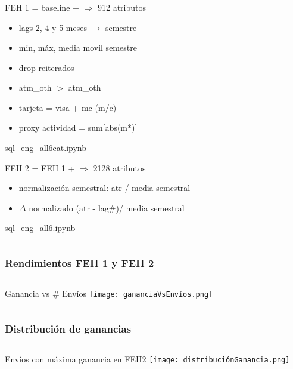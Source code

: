 \documentclass[aspectratio=169]{beamer} %
\begin{document}
\begin{frame}
  \frametitle{}
  \begin{columns}[onlytextwidth]
    \begin{column}{.6\textwidth}
     \begin{block}{FEH 1 = baseline + $\Rightarrow$ 912 atributos}
        \begin{itemize}
          \item lags 2, 4 y 5 meses $\rightarrow$ semestre
          \item min, máx, media movil semestre
          \item drop reiterados
          \item atm\_oth $>$ atm\_oth
          \item tarjeta = visa + mc (m/c)
          \item proxy actividad = sum[abs(m*)]
		    \end{itemize}
        {\tiny sql\_eng\_all6cat.ipynb}
      \end{block}
     
      \begin{block}{FEH 2 = FEH 1 + $\Rightarrow$ 2128 atributos}
        \begin{itemize}
          \item normalización semestral: atr / media semestral
          \item $\Delta$ normalizado (atr - lag\#)/ media semestral
		    \end{itemize}
        {\tiny sql\_eng\_all6.ipynb}
      \end{block}
    \end{column}
  \end{columns}
\end{frame}


\begin{frame}
  \frametitle{Rendimientos FEH 1 y FEH 2}
  \begin{columns}[onlytextwidth]
    \begin{column}{.6\textwidth}
      \begin{block}{Ganancia vs \# Envíos}
        \texttt{[image: gananciaVsEnvíos.png]}
      \end{block}
    \end{column}
  \end{columns}      
\end{frame}


\begin{frame}
  \frametitle{Distribución de ganancias}
  \begin{columns}[onlytextwidth]
    \begin{column}{.6\textwidth}
      \begin{block}{Envíos con máxima ganancia en FEH2}
        \texttt{[image: distribuciónGanancia.png]}
      \end{block}
    \end{column}
  \end{columns}      
\end{frame}
\end{document}
